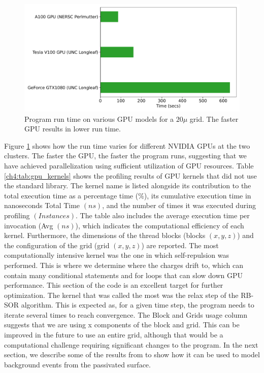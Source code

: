 \begin{figure}[!htb]
    \centering
    \includegraphics[width=0.99\linewidth]{ch4/figs/gpu_comp.pdf}
\caption{\label{ch4:fig:GPU_comp} Program run time on various GPU models for a $20\mu$ grid. The faster GPU results in lower run time.}
\end{figure}

Figure \ref{ch4:fig:GPU_comp} shows how the run time varies for different NVIDIA GPUs at the two clusters. The faster the GPU, the faster the program runs, suggesting that we have achieved parallelization using sufficient utilization of GPU resources. Table \ref{ch4:tab:gpu_kernels} shows the profiling results of GPU kernels that did not use the standard library. The kernel name is listed alongside its contribution to the total execution time as a percentage time ($\%$), its cumulative execution time in nanoseconds Total Time $(ns)$, and the number of times it was executed during profiling $(Instances)$. The table also includes the average execution time per invocation (Avg $(ns)$), which indicates the computational efficiency of each kernel. Furthermore, the dimensions of the thread blocks (blocks $(x, y, z)$) and the configuration of the grid (grid $(x, y, z)$) are reported. The most computationally intensive kernel was the one in which self-repulsion was performed. This is where we determine where the charges drift to, which can contain many conditional statements and for loops that can slow down GPU performance. This section of the code is an excellent target for further optimization. The kernel that was called the most was the relax step of the RB-SOR algorithm. This is expected as, for a given time step, the program needs to iterate several times to reach convergence. The Block and Grids usage column suggests that we are using x components of the block and grid. This can be improved in the future to use an entire grid, although that would be a computational challenge requiring significant changes to the program. In the next section, we describe some of the results from {\ehd} to show how it can be used to model background events from the passivated surface.



